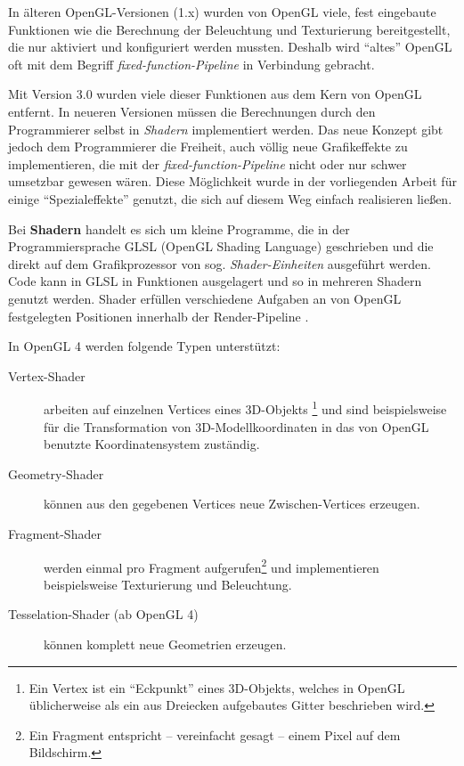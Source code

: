 \documentclass[a4paper,10pt]{sphinxmanual}
\begin{document}
In älteren OpenGL-Versionen (1.x) wurden von OpenGL viele, fest eingebaute Funktionen wie die Berechnung der Beleuchtung und Texturierung bereitgestellt, die nur aktiviert und konfiguriert werden mussten.
Deshalb wird "`altes"' OpenGL oft mit dem Begriff \emph{fixed-function-Pipeline} \cite{akenine-moller_real-time_2008} in Verbindung gebracht.

Mit Version 3.0 wurden viele dieser Funktionen aus dem Kern von OpenGL entfernt. In neueren Versionen müssen die Berechnungen durch den Programmierer selbst in \emph{Shadern} implementiert werden.
Das neue Konzept gibt jedoch dem Programmierer die Freiheit, auch völlig neue Grafikeffekte zu implementieren, die mit der \emph{fixed-function-Pipeline} nicht oder nur schwer umsetzbar gewesen wären.
Diese Möglichkeit wurde in der vorliegenden Arbeit für einige "`Spezialeffekte"' genutzt, die sich auf diesem Weg einfach realisieren ließen.

Bei \textbf{Shadern} handelt es sich um kleine Programme, die in der Programmiersprache GLSL (OpenGL Shading Language) geschrieben und die direkt auf dem Grafikprozessor von sog. \emph{Shader-Einheiten} ausgeführt werden.
Code kann in GLSL in Funktionen ausgelagert und so in mehreren Shadern genutzt werden.
Shader erfüllen verschiedene Aufgaben an von OpenGL festgelegten Positionen innerhalb der Render-Pipeline \cite{www:glpipe} \cite{akenine-moller_real-time_2008}.

In OpenGL 4 werden folgende Typen unterstützt:
\begin{description}
\item[{Vertex-Shader}] \leavevmode
arbeiten auf einzelnen Vertices eines 3D-Objekts \footnote{
Ein Vertex ist ein "`Eckpunkt"' eines 3D-Objekts, welches in OpenGL üblicherweise als ein aus Dreiecken aufgebautes Gitter beschrieben wird.
} und sind beispielsweise für die Transformation von 3D-Modellkoordinaten in das von OpenGL benutzte Koordinatensystem zuständig.

\item[{Geometry-Shader}] \leavevmode
können aus den gegebenen Vertices neue Zwischen-Vertices erzeugen.

\item[{Fragment-Shader}] \leavevmode
werden einmal pro Fragment aufgerufen\footnote{
Ein Fragment entspricht – vereinfacht gesagt – einem Pixel auf dem Bildschirm.
} und implementieren beispielsweise Texturierung und Beleuchtung.

\item[{Tesselation-Shader (ab OpenGL 4)}] \leavevmode
können komplett neue Geometrien erzeugen.

\end{description}
\end{document}
